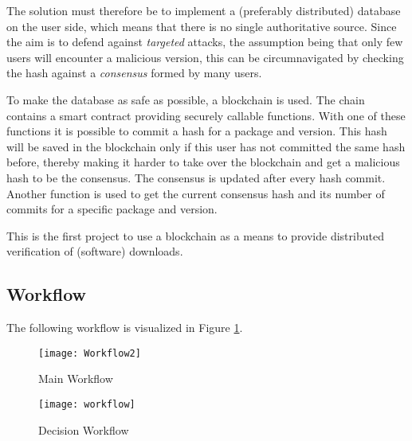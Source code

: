 The solution must therefore be to implement a (preferably distributed) database on the user side, which means that there is no single authoritative source.
Since the aim is to defend against \emph{targeted} attacks, the assumption being that only few users will encounter a malicious version, this can be circumnavigated by checking the hash against a \emph{consensus} formed by many users.

To make the database as safe as possible, a blockchain is used. The chain contains a smart contract providing securely callable functions. With one of these functions it is possible to commit a hash for a package and version. This hash will be saved in the blockchain only if this user has not committed the same hash before, thereby making it harder to take over the blockchain and get a malicious hash to be the consensus. The consensus is updated after every hash commit. Another function is used to get the current consensus hash and its number of commits for a specific package and version.

This is the first project to use a blockchain as a means to provide distributed verification of (software) downloads.

\subsection*{Workflow}
\label{sec:workflow}
The following workflow is visualized in Figure \ref{fig:main_workflow}.
\begin{figure}
	\centering
		\texttt{[image: Workflow2]}
	\caption{Main Workflow}
	\label{fig:main_workflow}
\end{figure}

\begin{figure}
	\centering
		\texttt{[image: workflow]}
	\caption{Decision Workflow}
	\label{fig:decision_workflow}
\end{figure}


